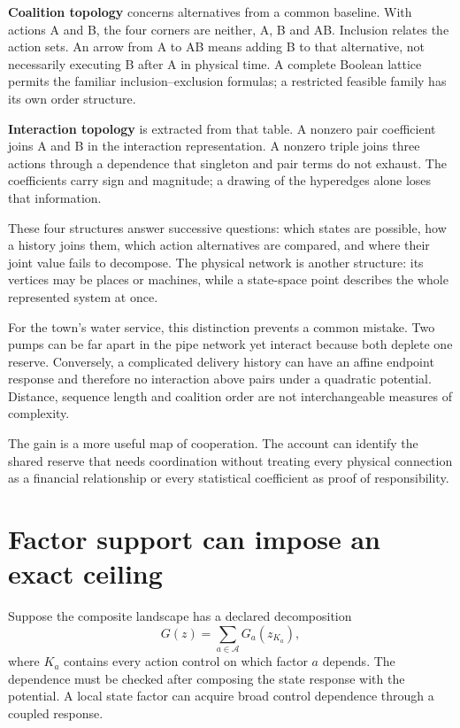 \textbf{Coalition topology} concerns alternatives from a common baseline. With actions A and B, the four corners are neither, A, B and AB. Inclusion relates the action sets. An arrow from A to AB means adding B to that alternative, not necessarily executing B after A in physical time. A complete Boolean lattice permits the familiar inclusion--exclusion formulas; a restricted feasible family has its own order structure.

\textbf{Interaction topology} is extracted from that table. A nonzero pair coefficient joins A and B in the interaction representation. A nonzero triple joins three actions through a dependence that singleton and pair terms do not exhaust. The coefficients carry sign and magnitude; a drawing of the hyperedges alone loses that information.

These four structures answer successive questions: which states are possible, how a history joins them, which action alternatives are compared, and where their joint value fails to decompose. The physical network is another structure: its vertices may be places or machines, while a state-space point describes the whole represented system at once.

For the town's water service, this distinction prevents a common mistake. Two pumps can be far apart in the pipe network yet interact because both deplete one reserve. Conversely, a complicated delivery history can have an affine endpoint response and therefore no interaction above pairs under a quadratic potential. Distance, sequence length and coalition order are not interchangeable measures of complexity.

The gain is a more useful map of cooperation. The account can identify the shared reserve that needs coordination without treating every physical connection as a financial relationship or every statistical coefficient as proof of responsibility.

\section{Factor support can impose an exact ceiling}
Suppose the composite landscape has a declared decomposition
\begin{equation}\label{eq:composite-factors}
 G(z)=\sum_{a\in\mathcal A}G_a(z_{K_a}),
\end{equation}
where $K_a$ contains every action control on which factor $a$ depends. The dependence must be checked after composing the state response with the potential. A local state factor can acquire broad control dependence through a coupled response.

